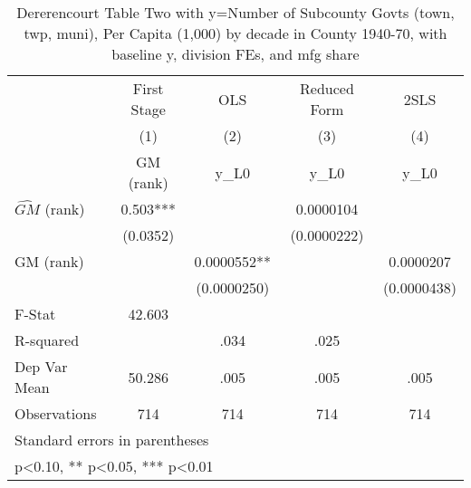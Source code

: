 \begin{table}[htbp]\centering
\def\sym#1{\ifmmode^{#1}\else\(^{#1}\)\fi}
\caption{Dererencourt Table Two with y=Number of Subcounty Govts (town, twp, muni), Per Capita (1,000) by decade in County 1940-70, with baseline y, division FEs, and mfg share}
\begin{tabular}{l*{4}{c}}
\toprule
                    & First Stage   &         OLS   &Reduced Form   &        2SLS   \\
                    &\multicolumn{1}{c}{(1)}&\multicolumn{1}{c}{(2)}&\multicolumn{1}{c}{(3)}&\multicolumn{1}{c}{(4)}\\
                    &\multicolumn{1}{c}{GM  (rank)}&\multicolumn{1}{c}{y\_L0}&\multicolumn{1}{c}{y\_L0}&\multicolumn{1}{c}{y\_L0}\\
\midrule
$\hat{GM}$ (rank)   &       0.503***&               &   0.0000104   &               \\
                    &    (0.0352)   &               & (0.0000222)   &               \\
\addlinespace
GM  (rank)          &               &   0.0000552** &               &   0.0000207   \\
                    &               & (0.0000250)   &               & (0.0000438)   \\
\midrule
F-Stat              &      42.603   &               &               &               \\
R-squared           &               &        .034   &        .025   &               \\
Dep Var Mean        &      50.286   &        .005   &        .005   &        .005   \\
Observations        &         714   &         714   &         714   &         714   \\
\bottomrule
\multicolumn{5}{l}{\footnotesize Standard errors in parentheses}\\
\multicolumn{5}{l}{\footnotesize * p<0.10, ** p<0.05, *** p<0.01}\\
\end{tabular}
\end{table}
